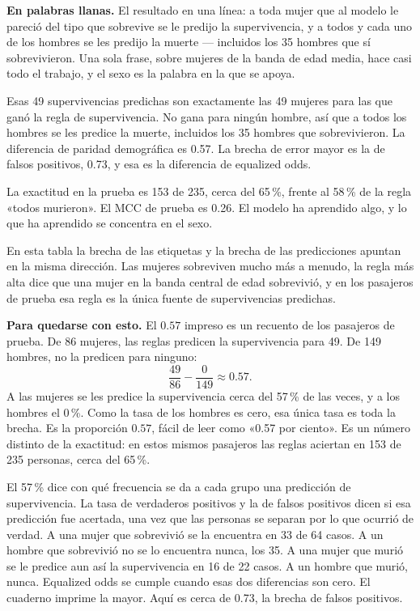 \documentclass[11pt]{article}
\newcommand{\pct}[1]{\mbox{#1\,\%}}
\begin{document}
\begin{plainwords}
\textbf{En palabras llanas.} El resultado en una línea: a toda mujer que al modelo le pareció del tipo que sobrevive se le predijo la supervivencia, y a todos y cada uno de los hombres se les predijo la muerte --- incluidos los 35 hombres que sí sobrevivieron. Una sola frase, sobre mujeres de la banda de edad media, hace casi todo el trabajo, y el sexo es la palabra en la que se apoya.
\end{plainwords}

Esas 49 supervivencias predichas son exactamente las 49 mujeres para las que ganó la regla de supervivencia. No gana para ningún hombre, así que a todos los hombres se les predice la muerte, incluidos los 35 hombres que sobrevivieron. La diferencia de paridad demográfica es 0.57. La brecha de error mayor es la de falsos positivos, 0.73, y esa es la diferencia de equalized odds.

La exactitud en la prueba es 153 de 235, cerca del \pct{65}, frente al \pct{58} de la regla «todos murieron». El MCC de prueba es 0.26. El modelo ha aprendido algo, y lo que ha aprendido se concentra en el sexo.

\begin{lesson}
En esta tabla la brecha de las etiquetas y la brecha de las predicciones apuntan en la misma dirección. Las mujeres sobreviven mucho más a menudo, la regla más alta dice que una mujer en la banda central de edad sobrevivió, y en los pasajeros de prueba esa regla es la única fuente de supervivencias predichas.
\end{lesson}

\begin{plainwords}
\textbf{Para quedarse con esto.} El \(0.57\) impreso es un recuento de los pasajeros de prueba. De 86 mujeres, las reglas predicen la supervivencia para 49. De 149 hombres, no la predicen para ninguno:
\[
\frac{49}{86} - \frac{0}{149} \approx 0.57.
\]
A las mujeres se les predice la supervivencia cerca del \pct{57} de las veces, y a los hombres el \pct{0}. Como la tasa de los hombres es cero, esa única tasa es toda la brecha. Es la proporción \(0.57\), fácil de leer como «0.57 por ciento». Es un número distinto de la exactitud: en estos mismos pasajeros las reglas aciertan en 153 de 235 personas, cerca del \pct{65}.

El \pct{57} dice con qué frecuencia se da a cada grupo una predicción de supervivencia. La tasa de verdaderos positivos y la de falsos positivos dicen si esa predicción fue acertada, una vez que las personas se separan por lo que ocurrió de verdad. A una mujer que sobrevivió se la encuentra en 33 de 64 casos. A un hombre que sobrevivió no se lo encuentra nunca, los 35. A una mujer que murió se le predice aun así la supervivencia en 16 de 22 casos. A un hombre que murió, nunca. Equalized odds se cumple cuando esas dos diferencias son cero. El cuaderno imprime la mayor. Aquí es cerca de 0.73, la brecha de falsos positivos.
\end{plainwords}
\end{document}
